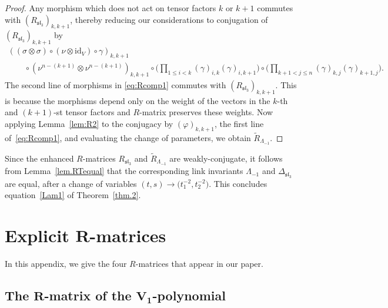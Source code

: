 \documentclass[10pt,a4paper]{amsart}
\numberwithin{equation}{section}
\theoremstyle{definition}
\begin{document}
\begin{proof}Any morphism which does not act on tensor factors $k$ or $k+1$ commutes with
$({R}_{\mathfrak{sl}_3})_{k,k+1}$, thereby reducing our considerations to conjugation
of $({R}_{\mathfrak{sl}_3})_{k,k+1}$ by
\begin{gather}
((\sigma \otimes \sigma)
\circ (\nu\otimes \mathrm{id}_V)\circ \gamma)_{k,k+1}\nonumber
\\
\qquad{} \circ(\nu^{n-(k+1)}\otimes \nu^{n-(k+1)})_{k,k+1}\circ
\biggl(\prod_{1\leq i<k}(\gamma)_{i,k}(\gamma)_{i,k+1}\biggr)\circ
\biggl(\prod_{k+1<j \leq n}(\gamma)_{k,j}(\gamma)_{k+1,j}\biggr).\!\!\!\label{eq:Rcomp1}
\end{gather}
The second line of morphisms in \eqref{eq:Rcomp1} commutes with
$(R_{\mathfrak{sl}_3})_{k,k+1}$. This is because the morphisms depend only on the weight of
the vectors in the $k$-th and $(k+1)$-st tensor factors and $R$-matrix preserves
these weights. Now applying Lemma~\ref{lem:R2} to the conjugacy by $(\varphi)_{k,k+1}$,
the first line of~\eqref{eq:Rcomp1}, and evaluating the change of parameters,
we obtain $\tilde{R}_{\Lambda_{-1}}$.
\end{proof}

Since the enhanced $R$-matrices $R_{\mathfrak{sl}_3}$ and $\tilde{R}_{\Lambda_{-1}}$ are
weakly-conjugate, it follows from Lemma~\ref{lem.RTequal} that the corresponding
link invariants $\Lambda_{-1}$ and $\Delta_{\mathfrak{sl}_3}$ are equal, after a change of
variables $(t,s) \to \bigl(t_1^{-2},t_2^{-2}\bigr)$.
This concludes equation~\eqref{Lam1} of Theorem~\ref{thm.2}.

\appendix

\section[Explicit R-matrices]{Explicit $\boldsymbol{R}$-matrices}

In this appendix, we give the four $R$-matrices that appear in our paper.

\subsection[The R-matrix of the V\_1-polynomial]{The $\boldsymbol{R}$-matrix of the $\boldsymbol{V_1}$-polynomial}
\label{sec:app1}
\end{document}
